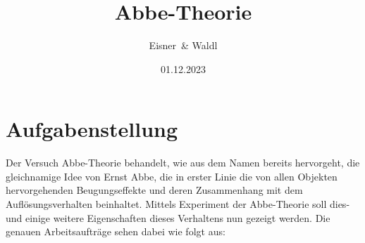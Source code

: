 \documentclass[12pt,a4paper,twoside]{article}
\begin{document}
\newcommand\laboratorynumber{2}
\title{Abbe-Theorie}
\newcommand\supervisor{Robert Nuster}
\newcommand\groupnumber{42}

\newcommand\participantonelastname{Eisner}
\newcommand\participantonefirstname{Nico}
\newcommand\participantoneid{12214121}
\newcommand\participanttwolastname{Waldl}
\newcommand\participanttwofirstname{Philip}
\newcommand\participanttwoid{12214120}
\author{\participantonelastname \ \& \participanttwolastname}

\newcommand\degreeid{UB 033 678}
\newcommand\semester{23WS}
\date{01.12.2023}

\newcommand\coursetitle{Laborübungen 2: \\ Elektrizität, Magnetismus, Optik}

%



\tableofcontents
\newpage

\section{Aufgabenstellung} %

Der Versuch Abbe-Theorie behandelt, wie aus dem Namen bereits hervorgeht, die gleichnamige Idee von Ernst Abbe, die in erster Linie die von allen Objekten hervorgehenden Beugungseffekte und deren Zusammenhang mit dem Auflösungsverhalten beinhaltet.
Mittels Experiment der Abbe-Theorie soll dies- und einige weitere Eigenschaften dieses Verhaltens nun gezeigt werden.
Die genauen Arbeitsaufträge sehen dabei wie folgt aus:
\end{document}
